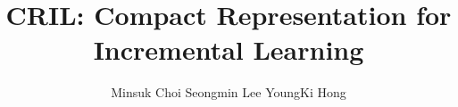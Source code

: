 \documentclass[prodmode,acmtecs]{acmsmall} %
\begin{document}
\title{CRIL: Compact Representation for Incremental Learning}
\author{Minsuk Choi
Seongmin Lee
YoungKi Hong
}



\maketitle







\end{document}
